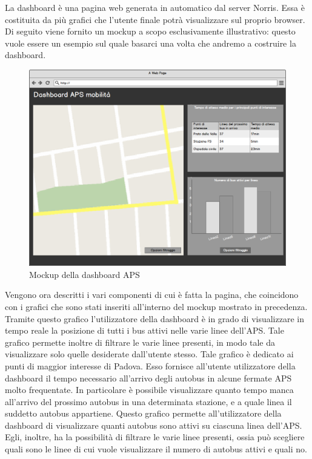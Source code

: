 	La dashboard è una pagina web generata in automatico dal server Norris. Essa è costituita da più grafici che l'utente finale potrà visualizzare sul proprio browser. Di seguito viene fornito un mockup a scopo esclusivamente illustrativo: questo vuole essere un esempio sul quale basarci una volta che andremo a costruire la dashboard.
	\begin{figure}[H]\centering
        \includegraphics[width=\textwidth]{SpecificaTecnica/Pics/DashboardMockup}
        \caption{Mockup della dashboard APS}
    \end{figure}
    Vengono ora descritti i vari componenti di cui è fatta la pagina, che coincidono con i grafici che sono stati inseriti all'interno del mockup mostrato in precedenza.
    		Tramite questo grafico l'utilizzatore della dashboard è in grado di visualizzare in tempo reale la posizione di tutti i bus attivi nelle varie linee dell'APS. Tale grafico permette inoltre di filtrare le varie linee presenti, in modo tale da visualizzare solo quelle desiderate dall'utente stesso.
    		Tale grafico è dedicato ai punti di maggior interesse di Padova. Esso fornisce all'utente utilizzatore della dashboard il tempo necessario all'arrivo degli autobus in alcune fermate APS molto frequentate. In particolare è possibile visualizzare quanto tempo manca all'arrivo del prossimo autobus in una determinata stazione, e a quale linea il suddetto autobus appartiene.
    		Questo grafico permette all'utilizzatore della dashboard di visualizzare quanti autobus sono attivi su ciascuna linea dell'APS. Egli, inoltre, ha la possibilità di filtrare le varie linee presenti, ossia può scegliere quali sono le linee di cui vuole visualizzare il numero di autobus attivi e quali no.
